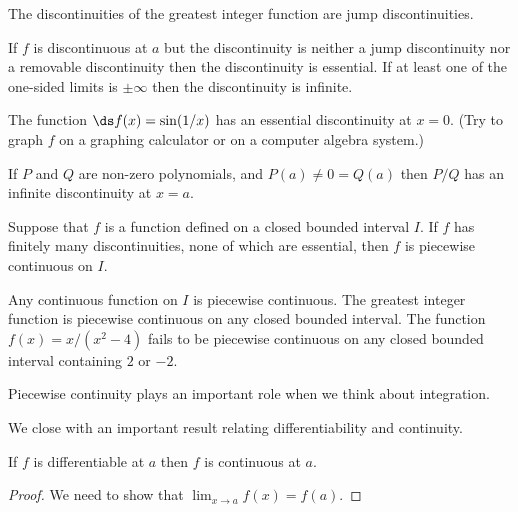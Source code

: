 \begin{example}
\begin{example}
\begin{example}
\begin{example}
\begin{example} The discontinuities of the greatest integer function are jump
discontinuities.
\endexam


\begin{definition} If $f$ is discontinuous at $a$ but the discontinuity is neither
a jump discontinuity nor a removable discontinuity then the
discontinuity is {\dfont essential}.
If at least one of the one-sided limits is $\pm \infty$ then the
discontinuity is {\dfont infinite}.
\end{definition}

\begin{example} The function $\ds f(x) =\sin (1/x)$ has an
essential discontinuity at $x=0 $.  (Try to graph $f$ on a graphing
calculator or on a computer algebra system.)
\endexam

\begin{example} If $P$ and $Q$ are non-zero polynomials,
 and $P(a) \neq 0 =Q(a) $ then ${P/Q}$ has an infinite discontinuity at $x=a $.
 \endexam

\begin{definition} Suppose that $f$ is a function defined on a closed bounded
 interval $I$. If $f$ has finitely many discontinuities, none of which
 are essential, then $f$ is 
{\dfont piecewise continuous} on $I$.
\end{definition}
\label{def:piecewise continuous}

 \begin{example} Any continuous function on $I$ is piecewise continuous. The
 greatest integer function is piecewise continuous on any closed
 bounded interval. The function $f(x)= x/( x^2 -4)$ fails to be
 piecewise continuous on any closed bounded interval containing $2$ or
 $-2$. \endexam

Piecewise continuity plays an important role when we think about integration.

We close with an important result relating differentiability and continuity.

\begin{theorem} If $f$ is differentiable at $a$ then $f$ is continuous at
$a$.

\begin{proof} We need to show that $\displaystyle{\lim _{x\to a} f(x) } =f(a) $.


\end{proof}
\end{theorem}
\end{example}
\end{example}
\end{example}
\end{example}
\end{example}
\end{example}
\end{example}
\end{example}
